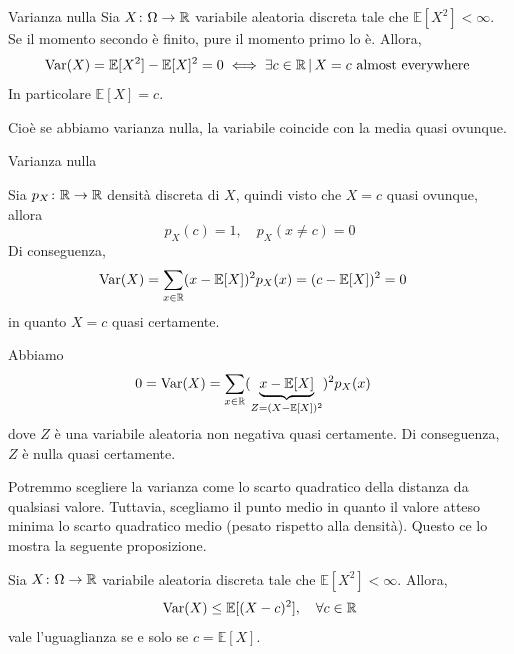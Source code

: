 \documentclass[a4paper]{article}
\begin{document}
\pagebreak

\begin{snippetproposition}{Varianza nulla}
    Sia \(X \colon \Omega \to \mathbb{R}\)
    variabile aleatoria discreta tale che
    \(\mathbb E[X^2] < \infty\).
    Se il momento secondo è finito, pure il momento primo lo è.
    Allora,
    \[
        \operatorname{Var}(X)
        = \mathbb E[X^2] - \mathbb E[X]^2 = 0
        \iff \exists c \in \mathbb{R} \,|\, X = c \text{ almost everywhere }
    \]
    In particolare \(\mathbb E[X] = c\).
\end{snippetproposition}

Cioè se abbiamo varianza nulla, la variabile coincide con la media quasi ovunque.

\begin{snippetproof}{Varianza nulla}
    \begin{ffiproof}
    \item Sia \(p_X \colon \mathbb{R} \to \mathbb{R}\)
        densità discreta di \(X\), quindi visto che \(X = c\) quasi ovunque, allora
        \[
            p_X(c) = 1, \quad p_X(x \neq c) = 0
        \]
        Di conseguenza,
        \begin{align*}
            \operatorname{Var}(X) = \sum_{x\in\mathbb{R}}
            (x- \mathbb E[X])^2p_X(x)
    &= (c - \mathbb E[X])^2 = 0
        \end{align*}
        in quanto \(X=c\) quasi certamente.
    \item Abbiamo
        \begin{align*}
            0 &= \operatorname{Var}(X) = \sum_{x\in\mathbb{R}}
            (\underbrace{x- \mathbb E[X]}_{Z = (X-\mathbb E[X])^2})^2p_X(x)
        \end{align*}
        dove \(Z\) è una variabile aleatoria non negativa quasi certamente.
        Di conseguenza, \(Z\) è nulla quasi certamente.
    \end{ffiproof}
\end{snippetproof}

Potremmo scegliere la varianza come lo scarto quadratico della distanza
da qualsiasi valore.
Tuttavia, scegliamo il punto medio in quanto il valore atteso minima lo scarto quadratico medio (pesato rispetto alla densità).
Questo ce lo mostra la seguente proposizione.

\begin{snippetproposition}{}
    Sia \(X \colon \Omega \to \mathbb{R}\) variabile aleatoria discreta tale che
    \(\mathbb E[X^2] < \infty\).
    Allora,
    \[
        \operatorname{Var}(X) \leq \mathbb E[(X-c)^2], \quad \forall c \in \mathbb{R}
    \]
    vale l'uguaglianza se e solo se \(c = \mathbb E[X]\).
\end{snippetproposition}
\end{document}
